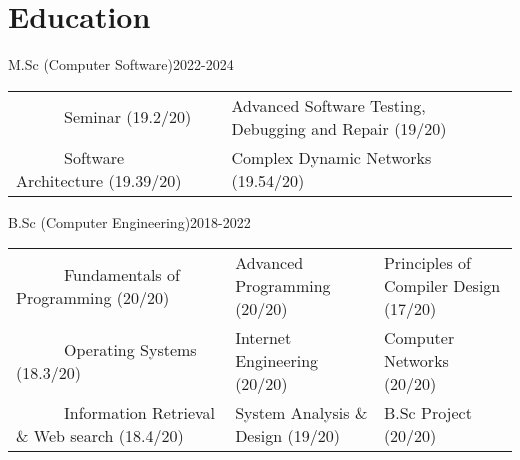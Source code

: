 \documentclass[11pt,a4paper,sans]{moderncv}
\title{}
\begin{document}
\hypersetup{
    linkcolor=blue,
    filecolor=magenta,
    urlcolor=cyan,
}
\noindent
\makecvtitle

\vspace{-0.5em}



\vspace{-0.4em}
\section{Education}

{M.Sc (Computer Software)}{2022-2024}{}{}
\small{
	\begin{tabular}
		{l@{\hskip 5mm}l@{\hskip 5mm}l}
		~~~~~~Seminar (19.2/20)   &    Advanced Software Testing, Debugging and Repair (19/20) \\
		~~~~~~Software Architecture (19.39/20)  & Complex Dynamic Networks (19.54/20) \\
	\end{tabular}
	\medskip
} %

\vspace{-0.2em}

\vspace{0.6em}

{B.Sc (Computer Engineering)}{2018-2022}{}{}
\small{
	\begin{tabular}
		{l@{\hskip 5mm}l@{\hskip 5mm}l}
		~~~~~~Fundamentals of Programming (20/20) & Advanced Programming (20/20) & Principles of Compiler Design (17/20) \\
		~~~~~~Operating Systems (18.3/20) & Internet Engineering (20/20) &  Computer Networks (20/20) \\
		~~~~~~Information Retrieval \& Web search (18.4/20) & System Analysis \& Design (19/20) & B.Sc Project (20/20)

	\end{tabular}
	\medskip
} %
\end{document}
